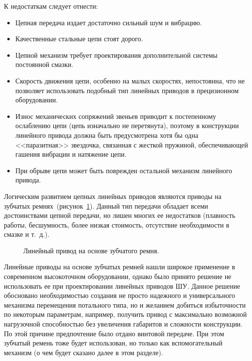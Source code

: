 К недостаткам следует отнести:

\begin{itemize}
	\item Цепная передача издает достаточно сильный шум и вибрацию.
	
	\item Качественные стальные цепи стоят дорого.
	
	\item Цепной механизм требует проектирования дополнительной системы постоянной смазки.
	
	\item Скорость движения цепи, особенно на малых скоростях, непостоянна, что не позволяет использовать подобный тип линейных приводов в прецизионном оборудовании.
	
	\item Износ механических сопряжений звеньев приводит к постепенному ослаблению цепи (цепь изначально не перетянута), поэтому в конструкции линейного привода должна быть предусмотрена хотя бы одна <<паразитная>> звездочка, связанная с жесткой пружиной, обеспечивающей гашения вибрации и натяжение цепи.
	
	\item При обрыве цепи может быть поврежден остальной механизм линейного привода.
\end{itemize}

Логическим развитием цепных линейных приводов являются приводы на зубчатых ремнях~(рисунок~\cref{fig:belt}). Данный тип передачи обладает всеми достоинствами цепной передачи, но лишен многих ее недостатков (плавность работы, бесшумность, более низкая стоимость, отсутствие необходимости в смазке и т.~д.). 

\begin{figure}[ht]
	\caption{Линейный привод на основе зубчатого ремня.}\label{fig:belt}
\end{figure}

Линейные приводы на основе зубчатых ремней нашли широкое применение в современном высокоточном оборудовании, однако было принято решение не использовать ее при проектировании линейных приводов ШУ. Данное решение обосновано необходимостью создания не просто надежного и универсального механизма перемещения потального типа, но и желанием добиться избыточности по некоторым параметрам, например, получить привод с максимально возможной нагрузочной способностью без увеличения габаритов и сложности конструкции. По этой причине предпочтение было отдано винтовой передаче. При этом зубчатый ремень тоже будет использован, но только как вспомогательный механизм (о чем будет сказано далее в этом разделе).

